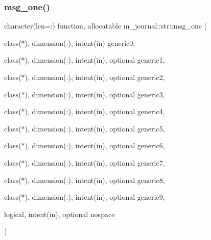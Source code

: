 \subsubsection{\texorpdfstring{msg\+\_\+one()}{msg\_one()}}
{\footnotesize\ttfamily character(len=\+:) function, allocatable m\+\_\+journal\+::str\+::msg\+\_\+one (\begin{DoxyParamCaption}\item[{class($\ast$), dimension(\+:), intent(in)}]{generic0,  }\item[{class($\ast$), dimension(\+:), intent(in), optional}]{generic1,  }\item[{class($\ast$), dimension(\+:), intent(in), optional}]{generic2,  }\item[{class($\ast$), dimension(\+:), intent(in), optional}]{generic3,  }\item[{class($\ast$), dimension(\+:), intent(in), optional}]{generic4,  }\item[{class($\ast$), dimension(\+:), intent(in), optional}]{generic5,  }\item[{class($\ast$), dimension(\+:), intent(in), optional}]{generic6,  }\item[{class($\ast$), dimension(\+:), intent(in), optional}]{generic7,  }\item[{class($\ast$), dimension(\+:), intent(in), optional}]{generic8,  }\item[{class($\ast$), dimension(\+:), intent(in), optional}]{generic9,  }\item[{logical, intent(in), optional}]{nospace }\end{DoxyParamCaption})\hspace{0.3cm}{\ttfamily [private]}}

\mbox{\label{interfacem__journal_1_1str_a69189d3260fdc40375cdf1c06a8ecfd8}} 
